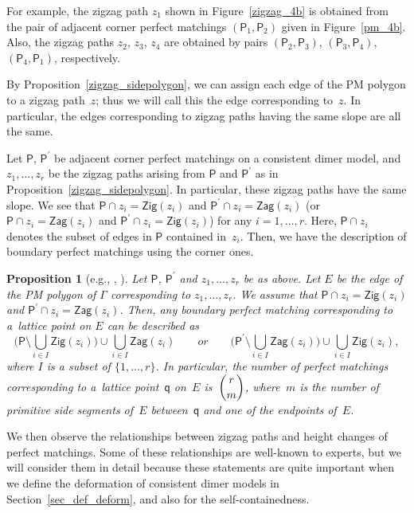 \documentclass[pdftex]{sigma}%
\numberwithin{equation}{section}
\numberwithin{figure}{section}
\numberwithin{table}{section}
\newtheorem{Proposition}[Theorem]{Proposition}
 { \theoremstyle{definition}
\newtheorem{Definition}[Theorem]{Definition}
\newtheorem{Note}[Theorem]{Note}
\newtheorem{Example}[Theorem]{Example}
\newtheorem{Remark}[Theorem]{Remark}
\newtheorem{observation}[Theorem]{Observation}
\newtheorem{operation}[Theorem]{Operation}
\newtheorem{setting}[Theorem]{Setting}}
\newcommand{\sfP}{\mathsf{P}}
\newcommand{\Zig}{\mathsf{Zig}}
\newcommand{\Zag}{\mathsf{Zag}}
\begin{document}
For example, the zigzag path $z_1$ shown in Figure~\ref{zigzag_4b} is obtained from the pair of adjacent corner perfect matchings $(\sfP_1,\sfP_2)$ given in Figure~\ref{pm_4b}. Also, the zigzag paths $z_2$, $z_3$, $z_4$ are obtained by pairs $(\sfP_2,\sfP_3)$, $(\sfP_3,\sfP_4)$, $(\sfP_4,\sfP_1)$, respectively.

By Proposition~\ref{zigzag_sidepolygon}, we can assign each edge of the PM polygon to a zigzag path~$z$;
thus we will call this the edge corresponding to~$z$.
In particular, the edges corresponding to zigzag paths having the same slope are all the same.

Let $\sfP$, $\sfP^\prime$ be adjacent corner perfect matchings on a consistent dimer model, and $z_1,\dots, z_r$ be the zigzag paths arising from $\sfP$ and $\sfP^\prime$ as in Proposition~\ref{zigzag_sidepolygon}.
In particular, these zigzag paths have the same slope.
We see that $\sfP\cap z_i=\Zig(z_i)$ and $\sfP^\prime\cap z_i=\Zag(z_i)$ (or $\sfP\cap z_i=\Zag(z_i)$ and $\sfP^\prime\cap z_i=\Zig(z_i)$) for any $i=1,\dots,r$. Here, $\sfP\cap z_i$ denotes the subset of edges in $\sfP$ contained in~$z_i$.
Then, we have the description of boundary perfect matchings using the corner ones.

\begin{Proposition}[{e.g., \cite[Proposition~4.35]{Bro}, \cite[Corollary~3.8]{Gul}}]\label{char_bound}
Let $\sfP$, $\sfP^\prime$ and $z_1,\dots, z_r$ be as above.
Let $E$ be the edge of the PM polygon of $\Gamma$ corresponding to $z_1,\dots, z_r$.
We assume that $\sfP\cap z_i=\Zig(z_i)$ and $\sfP^\prime\cap z_i=\Zag(z_i)$.
Then, any boundary perfect matching corresponding to a~lattice point on $E$ can be described as
\begin{displaymath}
\bigg(\sfP{\setminus}\bigcup_{i\in I}\Zig(z_i)\bigg)\cup\bigcup_{i\in I}\Zag(z_i) \qquad or \qquad \bigg(\sfP^\prime{\setminus}\bigcup_{i\in I}\Zag(z_i)\bigg)\cup\bigcup_{i\in I}\Zig(z_i),
\end{displaymath}
where $I$ is a subset of $\{1, \dots, r\}$.
In particular, the number of perfect matchings corresponding to a~lattice point~$\mathsf{q}$ on~$E$ is~$\dbinom{r}{m}$,
where~$m$ is the number of primitive side segments of~$E$ between~$\mathsf{q}$ and one of the endpoints of~$E$.
\end{Proposition}

We then observe the relationships between zigzag paths and height changes of perfect matchings.
Some of these relationships are well-known to experts, but we will consider them in detail because these statements are quite important
when we define the deformation of consistent dimer models in Section~\ref{sec_def_deform}, and also for the self-containedness.
\end{document}
